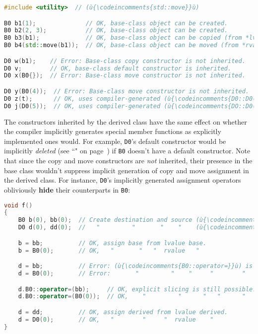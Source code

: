 \begin{lstlisting}[language=C++]
#include <utility>  // (ù{\codeincomments{std::move}}ù)

B0 b1(1);              // OK, base-class object can be created.
B0 b2(2, 3);           // OK, base-class object can be created.
B0 b3(b1);             // OK, base-class object can be copied (from *lvalue*).
B0 b4(std::move(b1));  // OK, base-class object can be moved (from *rvalue).

D0 w(b1);    // Error: Base-class copy constructor is not inherited.
D0 v;        // OK, base-class default constructor is inherited.
D0 x(B0{});  // Error: Base-class move constructor is not inherited.

D0 y(B0(4));  // Error: Base-class move constructor is not inherited.
D0 z(t);      // OK, uses compiler-generated (ù{\codeincomments{D0::D0(const D0\&)}}ù)
D0 j(D0(5));  // OK, uses compiler-generated (ù{\codeincomments{DO::D0(D\&\&)}}ù)
\end{lstlisting}
    
\noindent The constructors inherited by the derived class have the same effect on
whether the compiler implicitly generates special member functions as
explicitly implemented ones would. For example, \texttt{D0}'s default
constructor would be implicitly \emph{deleted} (see ``" on page~\pageref{deleted-functions}) if
\texttt{B0} doesn't have a default constructor. Note that since the copy
and move constructors are \emph{not} inherited, their presence in the
base class wouldn't suppress implicit generation of copy and move
assignment in the derived class. For instance, \texttt{D0}'s implicitly
generated assignment operators obliviously \textbf{hide} their
counterparts in \texttt{B0}:

\begin{lstlisting}[language=C++]
void f()
{
    B0 b(0), bb(0);  // Create destination and source (ù{\codeincomments{B0}}ù) objects.
    D0 d(0), dd(0);  //   "         "       "    "    (ù{\codeincomments{D0}}ù)    ".

    b = bb;          // OK, assign base from lvalue base.
    b = B0(0);       // OK,   "       "   "  rvalue   "

    d = bb;          // Error: (ù{\codeincomments{B0::operator=}}ù) is hidden by (ù{\codeincomments{D0::operator=}}ù).
    d = B0(0);       // Error:       "         "    "     "        "

    d.B0::operator=(bb);     // OK, explicit slicing is still possible.
    d.B0::operator=(B0(0));  // OK,    "         "      "   "      "

    d = dd;          // OK, assign derived from lvalue derived.
    d = D0(0);       // OK,   "        "     "  rvalue    "
}
\end{lstlisting}
    
